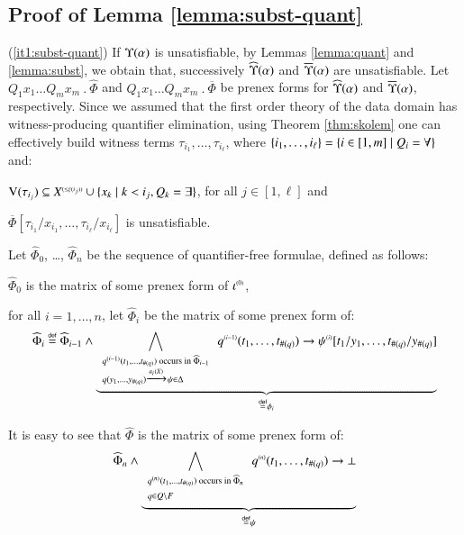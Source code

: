 \subsection{Proof of Lemma \ref{lemma:subst-quant}}

(\ref{it1:subst-quant}) If $\Upsilon({\alpha})$ is unsatisfiable, by
Lemmas \ref{lemma:quant} and \ref{lemma:subst}, we obtain that,
successively $\widehat{\Upsilon}({\alpha})$ and $\overline{\Upsilon}({\alpha})$ are
unsatisfiable. Let $Q_1x_1 \ldots Q_mx_m ~.~ \widehat{\Phi}$ and
$Q_1x_1 \ldots Q_mx_m ~.~ \overline{\Phi}$ be prenex forms for
$\widehat{\Upsilon}({\alpha})$ and $\overline{\Upsilon}({\alpha})$, respectively. Since we
assumed that the first order theory of the data domain has
witness-producing quantifier elimination, using Theorem
\ref{thm:skolem} one can effectively build witness terms $\tau_{i_1},
\ldots, \tau_{i_\ell}$, where $\{ i_1,\ldots,i_\ell \}=\{ i \in
  [1,m] \mid Q_i=\forall \}$ and: \begin{compactitem}
\item $\mathrm{V}({\tau_{i_j}}) \subseteq {X}^{\scriptscriptstyle{({\leq \xi(i_j)})}} \cup
  \{ x_k \mid k < i_j, Q_k = \exists \}$, for all $j \in [1,\ell]$ and
\item $\overline{\Phi}[\tau_{i_1}/x_{i_1}, \ldots,
  \tau_{i_\ell}/x_{i_\ell}]$ is unsatisfiable.
\end{compactitem}
Let $\widehat{\Phi}_0$, \ldots, $\widehat{\Phi}_n$ be the sequence of
quantifier-free formulae, defined as follows: \begin{compactitem}
\item $\widehat{\Phi}_0$ is the matrix of some prenex form of
  ${\iota}^{\scriptscriptstyle{({0})}}$,
\item for all $i=1,\ldots,n$, let $\widehat{\Phi}_i$ be the matrix of
  some prenex form of:
  \[\widehat{\Phi}_i \stackrel{\scriptscriptstyle{\mathsf{def}}}{=} \widehat{\Phi}_{i-1} \wedge
  \underbrace{\bigwedge_{\begin{array}{l}
        \scriptstyle{{q}^{\scriptscriptstyle{({i-1})}}(t_1,\ldots,t_{\#(q)}) \text{ occurs in } \widehat{\Phi}_{i-1}} \\
        \scriptstyle{q(y_1,\ldots,y_{\#(q)}) \xrightarrow{{\scriptscriptstyle a_i(X)}}_{{\scriptstyle }} \psi \in \Delta} 
    \end{array}} {q}^{\scriptscriptstyle{({i-1})}}(t_1,\ldots,t_{\#(q)}) \rightarrow 
    {\psi}^{\scriptscriptstyle{({i})}}[t_1/y_1, \ldots, t_{\#(q)}/y_{\#(q)}]}_{\stackrel{\scriptscriptstyle{\mathsf{def}}}{=} \phi_i}\]  
\end{compactitem}
It is easy to see that $\widehat{\Phi}$ is the matrix of some prenex
form of:
\[\widehat{\Phi}_n \wedge \underbrace{\bigwedge_{\begin{array}{l}
      \scriptstyle{{q}^{\scriptscriptstyle{({n})}}(t_1,\ldots,t_{\#(q)}) \text{ occurs in } \widehat{\Phi}_n} \\
      \scriptstyle{q \in Q \setminus F}
  \end{array}} {q}^{\scriptscriptstyle{({n})}}(t_1,\ldots,t_{\#(q)}) \rightarrow \bot}_{\stackrel{\scriptscriptstyle{\mathsf{def}}}{=} \psi}\]
